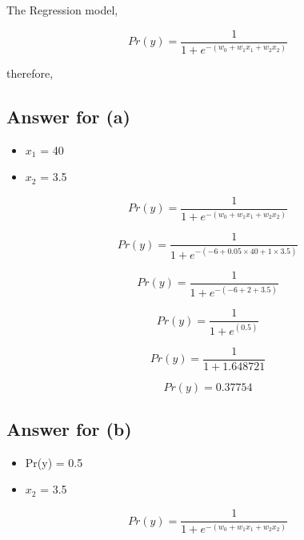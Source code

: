 \documentclass[11pt,a4paper]{article}
\begin{document}
The Regression model,

\begin{equation}
    Pr(y) = \frac{1}{1 + e^{-(w_{0} + w_{1}x_{1} + w_{2}x_{2})}}
\end{equation}

therefore, 

\newpage

\subsection{Answer for (a)}

\begin{itemize}
    \item $x_{1}$ = 40
    \item $x_{2}$ = 3.5
\end{itemize}

\begin{equation}
    Pr(y) = \frac{1}{1 + e^{-(w_{0} + w_{1}x_{1} + w_{2}x_{2})}}
\end{equation}

\begin{equation}
    Pr(y) = \frac{1}{1 + e^{-(-6 + 0.05 \times 40 + 1 \times 3.5)}}
\end{equation}

\begin{equation}
    Pr(y) = \frac{1}{1 + e^{-(-6 + 2 + 3.5)}}
\end{equation}

\begin{equation}
    Pr(y) = \frac{1}{1 + e^{(0.5)}}
\end{equation}

\begin{equation}
    Pr(y) = \frac{1}{1 + 1.648721}
\end{equation}

\begin{equation}
    Pr(y) = 0.37754
\end{equation}


\subsection{Answer for (b)}

\begin{itemize}
    \item Pr(y) = 0.5
    \item $x_{2}$ = 3.5
\end{itemize}


\begin{equation}
    Pr(y) = \frac{1}{1 + e^{-(w_{0} + w_{1}x_{1} + w_{2}x_{2})}}
\end{equation}
\end{document}
